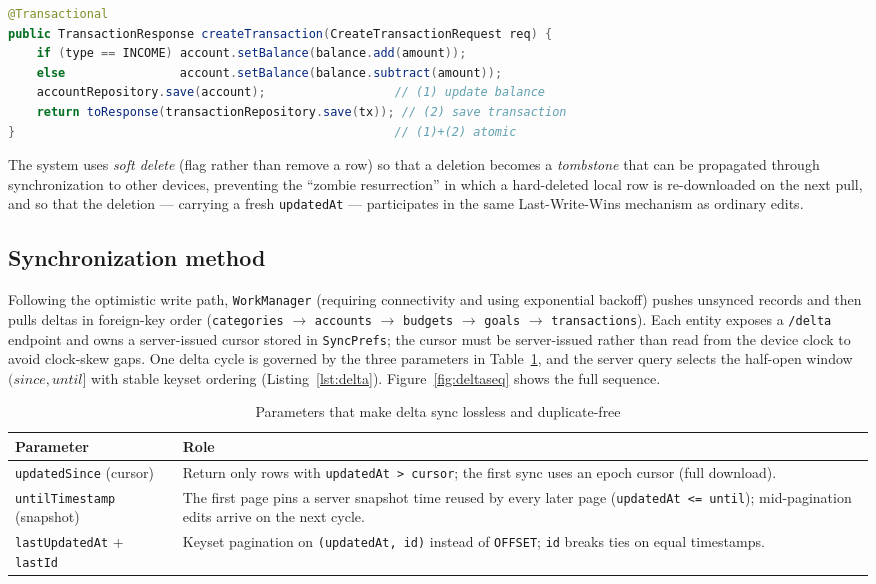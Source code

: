 \documentclass[13pt,a4paper]{extarticle}
\begin{document}
\begin{lstlisting}[language=Java,caption={Server-side atomic transaction creation (simplified).},label={lst:txn}]
@Transactional
public TransactionResponse createTransaction(CreateTransactionRequest req) {
    if (type == INCOME) account.setBalance(balance.add(amount));
    else                account.setBalance(balance.subtract(amount));
    accountRepository.save(account);                  // (1) update balance
    return toResponse(transactionRepository.save(tx)); // (2) save transaction
}                                                     // (1)+(2) atomic
\end{lstlisting}

The system uses \textit{soft delete} (flag rather than remove a row) so that a deletion becomes a
\textit{tombstone} that can be propagated through synchronization to other devices, preventing the
``zombie resurrection'' in which a hard-deleted local row is re-downloaded on the next pull, and so
that the deletion --- carrying a fresh \texttt{updatedAt} --- participates in the same Last-Write-Wins
mechanism as ordinary edits.

\subsection{Synchronization method}
Following the optimistic write path, \texttt{WorkManager} (requiring connectivity and using
exponential backoff) pushes unsynced records and then pulls deltas in foreign-key order
(\texttt{categories} $\rightarrow$ \texttt{accounts} $\rightarrow$ \texttt{budgets} $\rightarrow$
\texttt{goals} $\rightarrow$ \texttt{transactions}). Each entity exposes a \texttt{/delta} endpoint
and owns a server-issued cursor stored in \texttt{SyncPrefs}; the cursor must be server-issued
rather than read from the device clock to avoid clock-skew gaps. One delta cycle is governed by the
three parameters in Table~\ref{tab:delta}, and the server query selects the half-open window
$(\textit{since}, \textit{until}]$ with stable keyset ordering (Listing~\ref{lst:delta}).
Figure~\ref{fig:deltaseq} shows the full sequence.

\begin{table}[H]
\centering
\caption{Parameters that make delta sync lossless and duplicate-free}
\label{tab:delta}
\renewcommand{\arraystretch}{1.25}
\begin{tabularx}{\textwidth}{@{}l X@{}}
\toprule
\textbf{Parameter} & \textbf{Role} \\
\midrule
\texttt{updatedSince} (cursor) & Return only rows with \texttt{updatedAt > cursor}; the first sync uses an epoch cursor (full download). \\
\texttt{untilTimestamp} (snapshot) & The first page pins a server snapshot time reused by every later page (\texttt{updatedAt <= until}); mid-pagination edits arrive on the next cycle. \\
\texttt{lastUpdatedAt} + \texttt{lastId} & Keyset pagination on \texttt{(updatedAt, id)} instead of \texttt{OFFSET}; \texttt{id} breaks ties on equal timestamps. \\
\bottomrule
\end{tabularx}
\end{table}
\end{document}
